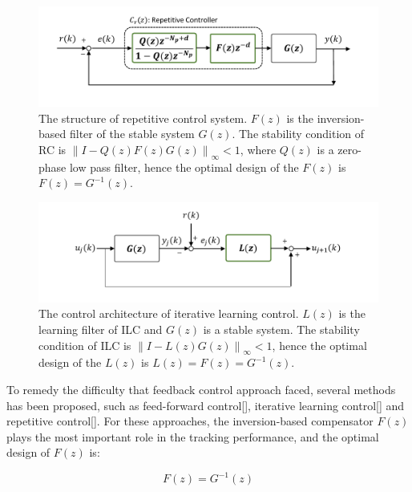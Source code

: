 \documentclass[a4paper, 12pt, twoside, openright]{mythesis}
\begin{document}
\begin{figure}
 	\begin{center}
   	\includegraphics[width=1.1\linewidth] {image/Repetitive}
 	\caption{The structure of repetitive control system. $F(z)$ is the inversion-based filter of the stable system $G(z)$. The stability condition of RC is $\left \| I-Q(z)F(z)G(z) \right \|_\infty<1$, where $Q(z)$ is a zero-phase low pass filter, hence the optimal design of the $F(z)$ is $F(z)=G^{-1}(z)$.}
 	\label{fig:RC}
 	\end{center}
\end{figure}


\begin{figure}
 	\begin{center}
   	\includegraphics[width=1.1\linewidth] {image/ILC}
 	\caption{The control architecture of iterative learning control. $L(z)$ is the learning filter of ILC and $G(z)$ is a stable system. The stability condition of ILC is $\left \| I-L(z)G(z) \right \|_\infty<1$, hence the optimal design of the $L(z)$ is $L(z)=F(z)=G^{-1}(z)$.}
 	\label{fig:ILC}
 	\end{center}
\end{figure}

To remedy the difficulty that feedback control approach faced, several methods has been proposed, such as feed-forward control[], iterative learning control[] and repetitive control[]. For these approaches, the inversion-based compensator $F(z)$ plays the most important role in the tracking performance, and the optimal design of $F(z)$ is:

\begin{equation}
 F(z) = G^{-1}(z)
\label{eq:F(z)}
\end{equation}
 
\end{document}
